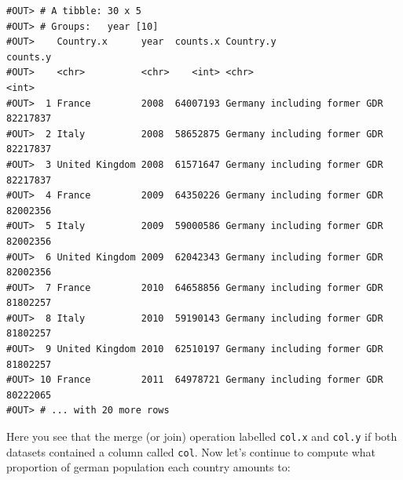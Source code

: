 \documentclass[]{book}
\newenvironment{Shaded}{\begin{snugshade}}{\end{snugshade}}
\newcommand{\KeywordTok}[1]{\textcolor[rgb]{0.13,0.29,0.53}{\textbf{#1}}}
\newcommand{\DataTypeTok}[1]{\textcolor[rgb]{0.13,0.29,0.53}{#1}}
\newcommand{\DecValTok}[1]{\textcolor[rgb]{0.00,0.00,0.81}{#1}}
\newcommand{\StringTok}[1]{\textcolor[rgb]{0.31,0.60,0.02}{#1}}
\newcommand{\CommentTok}[1]{\textcolor[rgb]{0.56,0.35,0.01}{\textit{#1}}}
\newcommand{\OperatorTok}[1]{\textcolor[rgb]{0.81,0.36,0.00}{\textbf{#1}}}
\newcommand{\NormalTok}[1]{#1}
\begin{document}
\begin{verbatim}
#OUT> # A tibble: 30 x 5
#OUT> # Groups:   year [10]
#OUT>    Country.x      year  counts.x Country.y                    counts.y
#OUT>    <chr>          <chr>    <int> <chr>                           <int>
#OUT>  1 France         2008  64007193 Germany including former GDR 82217837
#OUT>  2 Italy          2008  58652875 Germany including former GDR 82217837
#OUT>  3 United Kingdom 2008  61571647 Germany including former GDR 82217837
#OUT>  4 France         2009  64350226 Germany including former GDR 82002356
#OUT>  5 Italy          2009  59000586 Germany including former GDR 82002356
#OUT>  6 United Kingdom 2009  62042343 Germany including former GDR 82002356
#OUT>  7 France         2010  64658856 Germany including former GDR 81802257
#OUT>  8 Italy          2010  59190143 Germany including former GDR 81802257
#OUT>  9 United Kingdom 2010  62510197 Germany including former GDR 81802257
#OUT> 10 France         2011  64978721 Germany including former GDR 80222065
#OUT> # ... with 20 more rows
\end{verbatim}

Here you see that the merge (or join) operation labelled \texttt{col.x}
and \texttt{col.y} if both datasets contained a column called
\texttt{col}. Now let's continue to compute what proportion of german
population each country amounts to:

\begin{Shaded}
\end{Shaded}
\end{document}

